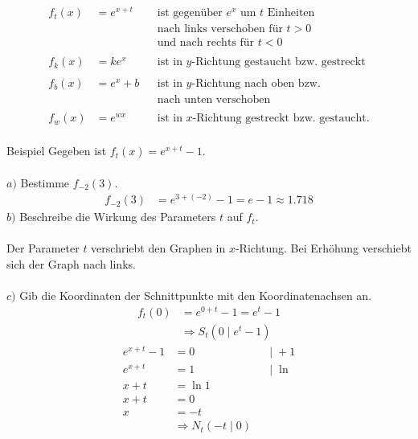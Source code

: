 \documentclass{article}
\begin{document}
\begin{align*}
    f_t(x)&=e^{x+t} & &\text{ist gegenüber } e^x \text{ um } t \text{ Einheiten} \\
    & & &\text{nach links verschoben für } t>0 \\
    & & &\text{und nach rechts für } t<0 \\\\
    f_k(x)&=ke^{x} & &\text{ist in } y \text{-Richtung gestaucht  bzw. gestreckt}\\\\
    f_b(x)&=e^{x}+b & &\text{ist in } y \text{-Richtung nach oben bzw.}\\
    & & &\text{nach unten verschoben} \\\\
    f_w(x)&=e^{wx} & &\text{ist in } x \text{-Richtung gestreckt bzw. gestaucht.}\\
\end{align*}

\begin{boxx}[DarkBlue]{Beispiel}
    Gegeben ist $f_t(x)=e^{x+t}-1$. \\\\
    $a)$\hspace{3mm} Bestimme $f_{-2}(3)$.
    \begin{align*}
        f_{-2}(3) &= e^{3+(-2)} -1 = e - 1 \approx 1.718
    \end{align*}
    $b)$\hspace{3mm} Beschreibe die Wirkung des Parameters $t$ auf $f_t$.\\\\
    Der Parameter $t$ verschriebt den Graphen in $x$-Richtung. 
    Bei Erhöhung verschiebt sich der Graph nach links.
    \\\\
    $c)$\hspace{3mm} Gib die Koordinaten der Schnittpunkte mit den Koordinatenachsen an.
    \begin{align*}
        f_t(0) &= e^{0+t} -1 = e^t - 1 \\
        &\Rightarrow S_t\left(0 \;|\; e^t-1\right)
    \end{align*}
    \begin{align*}
        && e^{x+t}-1 &= 0 & &|\; +1 && \\
        && e^{x+t} &= 1 & &|\; \ln && \\
        && x + t &= \ln 1 && \\
        && x + t &= 0 && \\
        && x &= -t && \\
        && &\Rightarrow N_t\left(-t \;|\;0\right)
    \end{align*}
\end{boxx}
\end{document}
